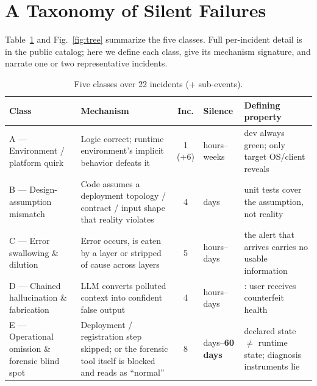 \section{A Taxonomy of Silent Failures}\label{sec:taxonomy}

Table~\ref{tab:classes} and Fig.~\ref{fig:tree} summarize the five
classes. Full per-incident detail is in the public catalog; here we
define each class, give its mechanism signature, and narrate one or two
representative incidents.

\begin{table}[t]
\centering\small
\caption{Five classes over 22 incidents (+ sub-events).}
\label{tab:classes}
\begin{tabular}{@{}p{31mm}p{40mm}cp{17mm}p{36mm}@{}}
\toprule
\textbf{Class} & \textbf{Mechanism} & \textbf{Inc.} &
\textbf{Silence} & \textbf{Defining property} \\
\midrule
A --- Environment / platform quirk & Logic correct; runtime
environment's implicit behavior defeats it & 1 (+6) & hours--weeks &
dev always green; only target OS/client reveals \\
\addlinespace[2pt]
B --- Design-assumption mismatch & Code assumes a deployment topology /
contract / input shape that reality violates & 4 & days & unit tests
cover the assumption, not reality \\
\addlinespace[2pt]
C --- Error swallowing \& dilution & Error occurs, is eaten by a layer
or stripped of cause across layers & 5 & hours--days & the alert that
arrives carries no usable information \\
\addlinespace[2pt]
D --- Chained hallucination \& fabrication & LLM converts polluted
context into confident false output & 4 & hours--days &
\failplausible{}: user receives counterfeit health \\
\addlinespace[2pt]
E --- Operational omission \& forensic blind spot & Deployment /
registration step skipped; or the forensic tool itself is blocked and
reads as ``normal'' & 8 & days--\textbf{60 days} & declared state
$\neq$ runtime state; diagnosis instruments lie \\
\bottomrule
\end{tabular}
\end{table}

